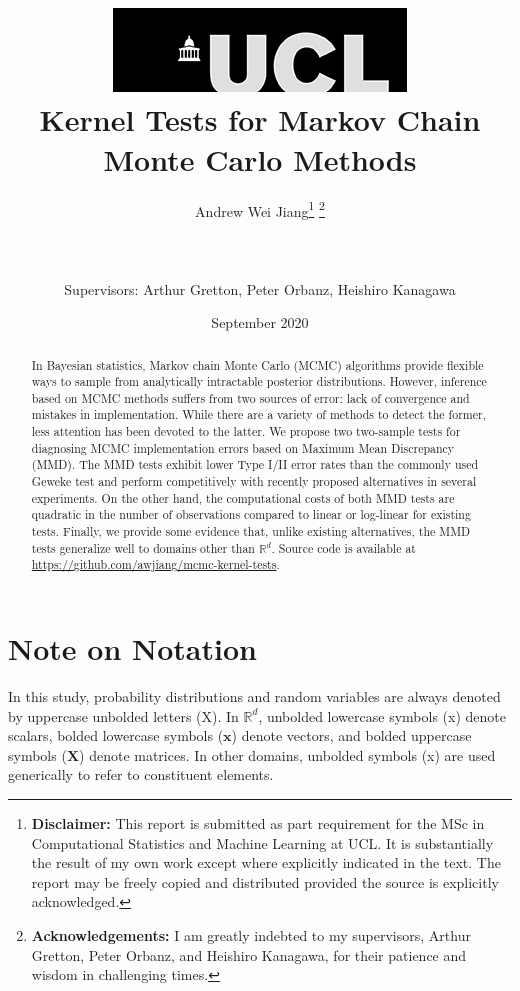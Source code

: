 \documentclass[a4paper,11pt]{article}
\title{  	{ \includegraphics[scale=.5]{figures/ucl_logo.png}}\\
{{\Huge Kernel Tests for Markov Chain Monte Carlo Methods}}\\
		}
\date{September 2020}
\author{Andrew Wei Jiang\thanks{
{\bf Disclaimer:}
This report is submitted as part requirement for the MSc in Computational Statistics and Machine Learning at UCL. It is
substantially the result of my own work except where explicitly indicated in the text. The report may be freely copied and distributed provided the source is explicitly acknowledged.
\newline}
\thanks{
{\bf Acknowledgements:}
I am greatly indebted to my supervisors, Arthur Gretton, Peter Orbanz, and Heishiro Kanagawa, for their patience and wisdom in challenging times.
\newline}
\\ \\
\\ \\
Supervisors: Arthur Gretton, Peter Orbanz, Heishiro Kanagawa}
\begin{document}
\maketitle
\thispagestyle{empty}
\onehalfspacing

\newpage
\begin{abstract}
    In Bayesian statistics, Markov chain Monte Carlo (MCMC) algorithms provide flexible ways to sample from analytically intractable posterior distributions. However, inference based on MCMC methods suffers from two sources of error: lack of convergence and mistakes in implementation. While there are a variety of methods to detect the former, less attention has been devoted to the latter. We propose two two-sample tests for diagnosing MCMC implementation errors based on Maximum Mean Discrepancy (MMD). The MMD tests exhibit lower Type I/II error rates than the commonly used Geweke test \cite{geweke_getting_2004} and perform competitively with recently proposed alternatives in several experiments. On the other hand, the computational costs of both MMD tests are quadratic in the number of observations compared to linear or log-linear for existing tests. Finally, we provide some evidence that, unlike existing alternatives, the MMD tests generalize well to domains other than $\mathbb{R}^{d}$. Source code is available at \url{https://github.com/awjiang/mcmc-kernel-tests}.
\end{abstract}
\setcounter{page}{1}
\newpage

\tableofcontents
\newpage

\section*{Note on Notation}
In this study, probability distributions and random variables are always denoted by uppercase unbolded letters (X). In $\mathbb{R}^{d}$, unbolded lowercase symbols (x) denote scalars, bolded lowercase symbols ($\mathbf{x}$) denote vectors, and bolded uppercase symbols ($\mathbf{X}$) denote matrices. In other domains, unbolded symbols (x) are used generically to refer to constituent elements.

\newpage
\end{document}

